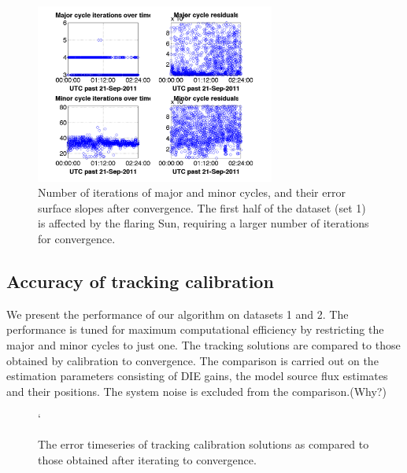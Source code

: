 \documentclass{aa}
\begin{document}
\begin{figure}[tbh]
\centering
\includegraphics[width=0.7\textwidth]{Figs/SB000_ch30-35_5sec_3hr_9_convcalsol_bin_iter}

\caption{\label{fig:Major-and-minor}Number of iterations of major and minor
cycles, and their error surface slopes after convergence. The first
half of the dataset (set 1) is affected by the flaring Sun, requiring
a larger number of iterations for convergence.}
\end{figure}




\subsection{Accuracy of tracking calibration}

We present the performance of our algorithm on datasets 1 and 2. The performance
is tuned for maximum computational efficiency by restricting the major and minor
cycles to  just one. The  tracking solutions are  compared to those  obtained by
calibration  to convergence.  The comparison  is carried  out on  the estimation
parameters consisting  of DIE gains, the  model source flux  estimates and their
positions. The system noise is excluded from the comparison.(Why?)

\begin{figure}[tbh]
`\caption{\label{fig:The-error-timeseries}The error timeseries of tracking
calibration solutions as compared to those obtained after iterating
to convergence. }
\end{figure}
\end{document}
